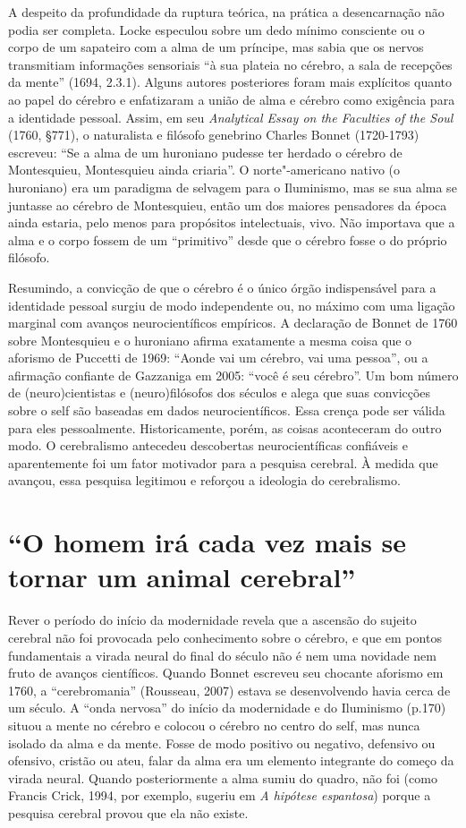 A despeito da profundidade da ruptura teórica, na prática a
desencarnação não podia ser completa. Locke especulou sobre um dedo
mínimo consciente ou o corpo de um sapateiro com a alma de um príncipe,
mas sabia que os nervos transmitiam informações sensoriais ``à sua
plateia no cérebro, a sala de recepções da mente'' (1694, 2.3.1). Alguns
autores posteriores foram mais explícitos quanto ao papel do cérebro e
enfatizaram a união de alma e cérebro como exigência para a identidade
pessoal. Assim, em seu \emph{Analytical Essay on the Faculties of the
Soul} (1760, §771), o naturalista e filósofo genebrino Charles Bonnet
(1720-1793) escreveu: ``Se a alma de um huroniano pudesse ter herdado o
cérebro de Montesquieu, Montesquieu ainda criaria''. O norte"-americano
nativo (o huroniano) era um paradigma de selvagem para o Iluminismo, mas
se sua alma se juntasse ao cérebro de Montesquieu, então um dos maiores
pensadores da época ainda estaria, pelo menos para propósitos
intelectuais, vivo. Não importava que a alma e o corpo fossem de um
``primitivo'' desde que o cérebro fosse o do próprio filósofo.

Resumindo, a convicção de que o cérebro é o único órgão indispensável
para a identidade pessoal surgiu de modo independente ou, no máximo com
uma ligação marginal com avanços neurocientíficos empíricos. A
declaração de Bonnet de 1760 sobre Montesquieu e o huroniano afirma
exatamente a mesma coisa que o aforismo de Puccetti de 1969: ``Aonde vai
um cérebro, vai uma pessoa'', ou a afirmação confiante de Gazzaniga em
2005: ``você é seu cérebro''. Um bom número de (neuro)cientistas e
(neuro)filósofos dos séculos  e  alega que suas convicções sobre o
self são baseadas em dados neurocientíficos. Essa crença pode ser válida
para eles pessoalmente. Historicamente, porém, as coisas aconteceram do
outro modo. O cerebralismo antecedeu descobertas neurocientíficas
confiáveis e aparentemente foi um fator motivador para a pesquisa
cerebral. À medida que avançou, essa pesquisa legitimou e reforçou a
ideologia do cerebralismo.

\chapter{``O homem irá cada vez mais se tornar um animal cerebral''}

Rever o período do início da modernidade revela que a ascensão do
sujeito cerebral não foi provocada pelo conhecimento sobre o cérebro, e
que em pontos fundamentais a virada neural do final do século  não é
nem uma novidade nem fruto de avanços científicos. Quando Bonnet
escreveu seu chocante aforismo em 1760, a ``cerebromania'' (Rousseau,
2007) estava se desenvolvendo havia cerca de um século. A ``onda
nervosa'' do início da modernidade e do Iluminismo (p.170) situou a
mente no cérebro e colocou o cérebro no centro do self, mas nunca
isolado da alma e da mente. Fosse de modo positivo ou negativo,
defensivo ou ofensivo, cristão ou ateu, falar da alma era um elemento
integrante do começo da virada neural. Quando posteriormente a alma
sumiu do quadro, não foi (como Francis Crick, 1994, por exemplo, sugeriu
em \emph{A hipótese espantosa}) porque a pesquisa cerebral provou que
ela não existe.

